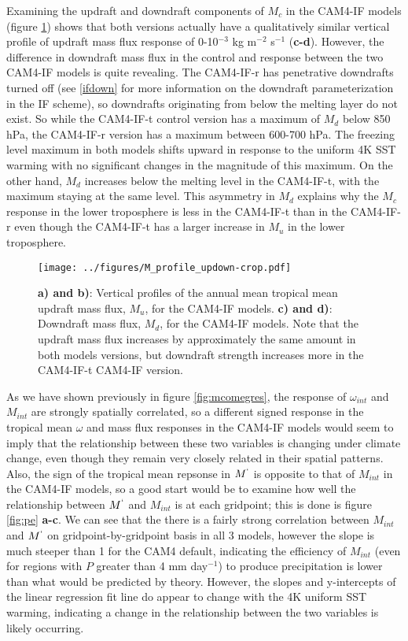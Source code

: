 \documentclass[letterpaper,12pt,titlepage,oneside,final]{book}
\begin{document}
Examining the updraft and downdraft components of $M_{c}$ in the CAM4-IF models (figure \ref{fig:updown}) shows that both versions actually have a qualitatively similar vertical profile of updraft mass flux response of 0-10$^{-3}$ kg m$^{-2}$ s$^{-1}$ (\textbf{c-d}). However, the difference in downdraft mass flux in the control and response between the two CAM4-IF models is quite revealing. The CAM4-IF-r has penetrative downdrafts turned off (see \ref{ifdown} for more information on the downdraft parameterization in the IF scheme), so downdrafts originating from below the melting layer do not exist. So while the CAM4-IF-t control version has a maximum of $M_{d}$ below 850 hPa, the CAM4-IF-r version has a maximum between 600-700 hPa. The freezing level maximum in both models shifts upward in response to the uniform 4K SST warming with no significant changes in the magnitude of this maximum. On the other hand, $M_{d}$ increases below the melting level in the CAM4-IF-t, with the maximum staying at the same level. This asymmetry in $M_{d}$ explains why the $M_{c}$ response in the lower troposphere is less in the CAM4-IF-t than in the CAM4-IF-r even though the CAM4-IF-t has a larger increase in $M_{u}$ in the lower troposphere. 
\begin{figure}[H]
\centering
\noindent\texttt{[image: ../figures/M\_profile\_updown-crop.pdf]}\hfill
\caption{ \textbf{a) and b)}: Vertical profiles of the annual mean tropical mean updraft mass flux, $M_{u}$, for the CAM4-IF models. \textbf{c) and d)}: Downdraft mass flux, $M_{d}$, for the CAM4-IF models. Note that the updraft mass flux increases by approximately the same amount in both models versions, but downdraft strength increases more in the CAM4-IF-t CAM4-IF version.}
\label{fig:updown}
\end{figure}
As we have shown previously in figure \ref{fig:mcomegres}, the response of $\omega_{int}$ and $M_{int}$ are strongly spatially correlated, so a different signed response in the tropical mean $\omega$ and mass flux responses in the CAM4-IF models would seem to imply that the relationship between these two variables is changing under climate change, even though they remain very closely related in their spatial patterns. Also, the sign of the tropical mean repsonse in $M^{`}$ is opposite to that of $M_{int}$ in the CAM4-IF models, so a good start would be to examine how well the relationship between $M^{`}$ and $M_{int}$ is at each gridpoint; this is done is figure \ref{fig:pe} \textbf{a-c}. We can see that the there is a fairly strong correlation between $M_{int}$ and $M^{`}$  on gridpoint-by-gridpoint basis in all 3 models, however the slope is much steeper than 1 for the CAM4 default, indicating the efficiency of $M_{int}$ (even for regions with $P$ greater than 4 mm day$^{-1}$) to produce precipitation is lower than what would be predicted by theory. However, the slopes and y-intercepts of the linear regression fit line do appear to change with the 4K uniform SST warming, indicating a change in the relationship between the two variables is likely occurring. 
\end{document}
